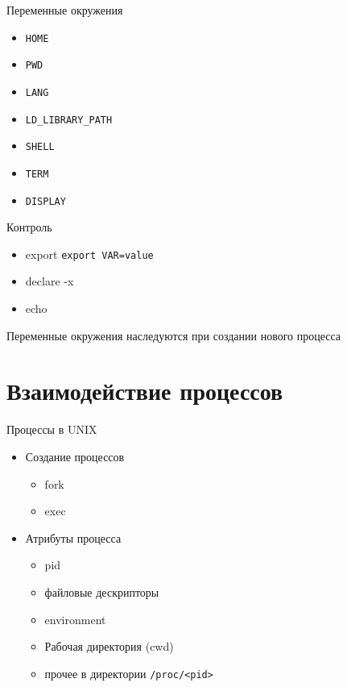 \documentclass[ignorenonframetext, professionalfonts, hyperref={pdftex, unicode}]{beamer}
\begin{document}
\begin{frame}{Переменные окружения}
  \begin{itemize}
    \item {\tt HOME}
    \item {\tt PWD}
    \item {\tt LANG}
    \item {\tt LD\_LIBRARY\_PATH}
    \item {\tt SHELL}
    \item {\tt TERM}
    \item {\tt DISPLAY}
  \end{itemize}

  Контроль

  \begin{itemize}
    \item export {\tt export VAR=value}
    \item declare -x
    \item echo 
  \end{itemize}

  Переменные окружения наследуются при создании нового процесса
\end{frame}

\section{Взаимодействие процессов}
\begin{frame}{Процессы в UNIX}
  \begin{itemize}
    \item Создание процессов
      \begin{itemize}
        \item fork
        \item exec
      \end{itemize}
    \item Атрибуты процесса
      \begin{itemize}
        \item pid 
        \item файловые дескрипторы
        \item environment
        \item Рабочая директория (cwd)
        \item прочее в директории {\tt /proc/<pid>}
      \end{itemize}
  \end{itemize}
\end{frame}
\end{document}
